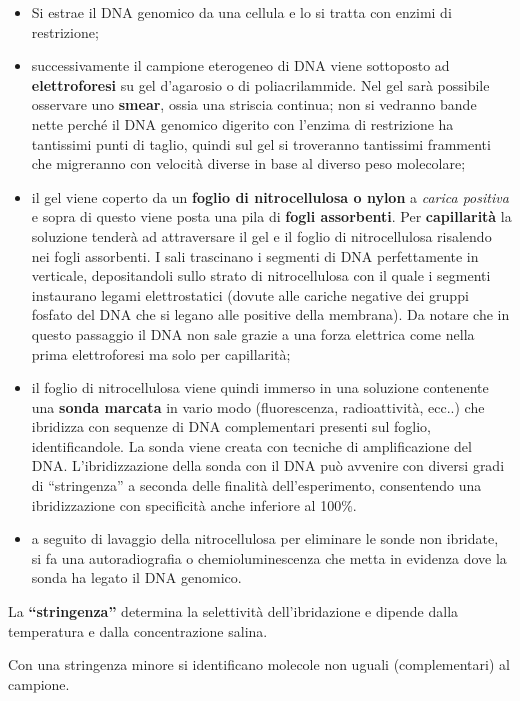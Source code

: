 \documentclass[11pt]{book}
\begin{document}
\begin{itemize}
\itemsep1pt\parskip0pt
\item
  Si estrae il DNA genomico da una cellula e lo si tratta con enzimi di
  restrizione;
\item
  successivamente il campione eterogeneo di DNA viene sottoposto ad
  \textbf{elettroforesi} su gel d'agarosio o di poliacrilammide. Nel gel
  sarà possibile osservare uno \textbf{smear}, ossia una striscia
  continua; non si vedranno bande nette perché il DNA genomico digerito
  con l'enzima di restrizione ha tantissimi punti di taglio, quindi sul
  gel si troveranno tantissimi frammenti che migreranno con velocità
  diverse in base al diverso peso molecolare;
\item
  il gel viene coperto da un \textbf{foglio di nitrocellulosa o nylon} a
  \emph{carica positiva} e sopra di questo viene posta una pila di
  \textbf{fogli assorbenti}. Per \textbf{capillarità} la soluzione
  tenderà ad attraversare il gel e il foglio di nitrocellulosa risalendo
  nei fogli assorbenti. I sali trascinano i segmenti di DNA
  perfettamente in verticale, depositandoli sullo strato di
  nitrocellulosa con il quale i segmenti instaurano legami
  elettrostatici (dovute alle cariche negative dei gruppi fosfato del
  DNA che si legano alle positive della membrana). Da notare che in
  questo passaggio il DNA non sale grazie a una forza elettrica come
  nella prima elettroforesi ma solo per capillarità;
\item
  il foglio di nitrocellulosa viene quindi immerso in una soluzione
  contenente una \textbf{sonda marcata} in vario modo (fluorescenza,
  radioattività, ecc..) che ibridizza con sequenze di DNA complementari
  presenti sul foglio, identificandole. La sonda viene creata con
  tecniche di amplificazione del DNA. L'ibridizzazione della sonda con
  il DNA può avvenire con diversi gradi di ``stringenza'' a seconda
  delle finalità dell'esperimento, consentendo una ibridizzazione con
  specificità anche inferiore al 100\%.
\item
  a seguito di lavaggio della nitrocellulosa per eliminare le sonde non
  ibridate, si fa una autoradiografia o chemioluminescenza che metta in
  evidenza dove la sonda ha legato il DNA genomico.
\end{itemize}

La \textbf{``stringenza''} determina la selettività dell'ibridazione e
dipende dalla temperatura e dalla concentrazione salina.

Con una stringenza minore si identificano molecole non uguali
(complementari) al campione.
\end{document}
